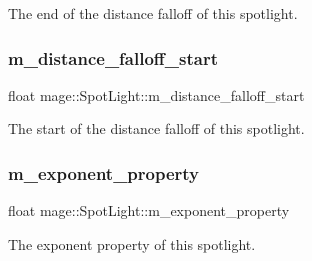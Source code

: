 The end of the distance falloff of this spotlight. \hypertarget{classmage_1_1_spot_light_a96c4a4f1b77c9a6aadb82cf48248cc5d}{}\label{classmage_1_1_spot_light_a96c4a4f1b77c9a6aadb82cf48248cc5d} 
\subsubsection{\texorpdfstring{m\+\_\+distance\+\_\+falloff\+\_\+start}{m\_distance\_falloff\_start}}
{\footnotesize\ttfamily float mage\+::\+Spot\+Light\+::m\+\_\+distance\+\_\+falloff\+\_\+start\hspace{0.3cm}{\ttfamily [private]}}

The start of the distance falloff of this spotlight. \hypertarget{classmage_1_1_spot_light_ac1ac3c8c25760d8beb7e05c8caeaa6a3}{}\label{classmage_1_1_spot_light_ac1ac3c8c25760d8beb7e05c8caeaa6a3} 
\subsubsection{\texorpdfstring{m\+\_\+exponent\+\_\+property}{m\_exponent\_property}}
{\footnotesize\ttfamily float mage\+::\+Spot\+Light\+::m\+\_\+exponent\+\_\+property\hspace{0.3cm}{\ttfamily [private]}}

The exponent property of this spotlight. 